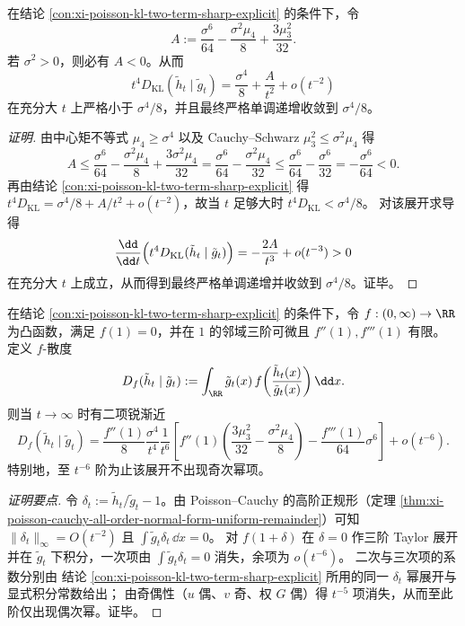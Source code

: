 \begin{conclusion}[六阶系数的严格负性与归一化相对熵的单调逼近]\label{con:xi-poisson-kl-sixth-coefficient-strictly-negative-monotone}
在结论 \ref{con:xi-poisson-kl-two-term-sharp-explicit} 的条件下，令
\[
A:=\frac{\sigma^6}{64}-\frac{\sigma^2\mu_4}{8}+\frac{3\mu_3^2}{32}.
\]
若 \(\sigma^2>0\)，则必有 \(A<0\)。从而
\[
t^4D_{\mathrm{KL}}(\tilde h_t\mid \tilde g_t)
=\frac{\sigma^4}{8}+\frac{A}{t^2}+o(t^{-2})
\]
在充分大 \(t\) 上严格小于 \(\sigma^4/8\)，并且最终严格单调递增收敛到 \(\sigma^4/8\)。
\end{conclusion}
\begin{proof}[证明]
由中心矩不等式 \(\mu_4\ge \sigma^4\) 以及 Cauchy--Schwarz
\(
\mu_3^2\le \sigma^2\mu_4
\)
得
\[
A
\le
\frac{\sigma^6}{64}-\frac{\sigma^2\mu_4}{8}+\frac{3\sigma^2\mu_4}{32}
=\frac{\sigma^6}{64}-\frac{\sigma^2\mu_4}{32}
\le
\frac{\sigma^6}{64}-\frac{\sigma^6}{32}
=-\frac{\sigma^6}{64}<0.
\]
再由结论 \ref{con:xi-poisson-kl-two-term-sharp-explicit} 得
\(
t^4D_{\mathrm{KL}}=\sigma^4/8+A/t^2+o(t^{-2})
\)，故当 \(t\) 足够大时 \(t^4D_{\mathrm{KL}}<\sigma^4/8\)。
对该展开求导得
\[
\frac{\dd}{\dd t}\Bigl(t^4D_{\mathrm{KL}}(\tilde h_t\mid\tilde g_t)\Bigr)
=-\frac{2A}{t^3}+o(t^{-3})>0
\]
在充分大 \(t\) 上成立，从而得到最终严格单调递增并收敛到 \(\sigma^4/8\)。证毕。
\end{proof}

\begin{conclusion}\label{con:xi-poisson-fdiv-two-term-sharp-no-odd}
在结论 \ref{con:xi-poisson-kl-two-term-sharp-explicit} 的条件下，令 \(f:(0,\infty)\to\RR\) 为凸函数，满足 \(f(1)=0\)，并在 \(1\) 的邻域三阶可微且 \(f''(1),f'''(1)\) 有限。
定义 \(f\)-散度
\[
D_f(\tilde h_t\mid\tilde g_t):=\int_{\RR}\tilde g_t(x)\,
f\!\left(\frac{\tilde h_t(x)}{\tilde g_t(x)}\right)\dd x.
\]
则当 \(t\to\infty\) 时有二项锐渐近
\[
D_f(\tilde h_t\mid\tilde g_t)
=\frac{f''(1)}{8}\frac{\sigma^4}{t^4}
\frac{1}{t^6}\left[
f''(1)\!\left(\frac{3\mu_3^2}{32}-\frac{\sigma^2\mu_4}{8}\right)
-\frac{f'''(1)}{64}\sigma^6
\right]
 +o(t^{-6}).
\]
特别地，至 \(t^{-6}\) 阶为止该展开不出现奇次幂项。
\end{conclusion}
\begin{proof}[证明要点]
令 \(\delta_t:=\tilde h_t/\tilde g_t-1\)。由 Poisson--Cauchy 的高阶正规形（定理 \ref{thm:xi-poisson-cauchy-all-order-normal-form-uniform-remainder}）可知 \(\|\delta_t\|_\infty=O(t^{-2})\) 且 \(\int \tilde g_t\delta_t\,\dd x=0\)。
对 \(f(1+\delta)\) 在 \(\delta=0\) 作三阶 Taylor 展开并在 \(\tilde g_t\) 下积分，一次项由 \(\int \tilde g_t\delta_t=0\) 消失，余项为 \(o(t^{-6})\)。
二次与三次项的系数分别由
结论 \ref{con:xi-poisson-kl-two-term-sharp-explicit} 所用的同一 \(\delta_t\) 幂展开与显式积分常数给出；
由奇偶性（\(u\) 偶、\(v\) 奇、权 \(G\) 偶）得 \(t^{-5}\) 项消失，从而至此阶仅出现偶次幂。证毕。
\end{proof}

